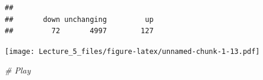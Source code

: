 \documentclass[]{article}
\newenvironment{Shaded}{\begin{snugshade}}{\end{snugshade}}
\newcommand{\KeywordTok}[1]{\textcolor[rgb]{0.13,0.29,0.53}{\textbf{#1}}}
\newcommand{\DataTypeTok}[1]{\textcolor[rgb]{0.13,0.29,0.53}{#1}}
\newcommand{\CommentTok}[1]{\textcolor[rgb]{0.56,0.35,0.01}{\textit{#1}}}
\newcommand{\OperatorTok}[1]{\textcolor[rgb]{0.81,0.36,0.00}{\textbf{#1}}}
\newcommand{\NormalTok}[1]{#1}
\begin{document}
\begin{verbatim}
## 
##       down unchanging         up 
##         72       4997        127
\end{verbatim}

\begin{Shaded}
\end{Shaded}

\texttt{[image: Lecture\_5\_files/figure-latex/unnamed-chunk-1-13.pdf]}

\begin{Shaded}
\begin{Highlighting}[]
\CommentTok{# Play}
\end{Highlighting}
\end{Shaded}
\end{document}

